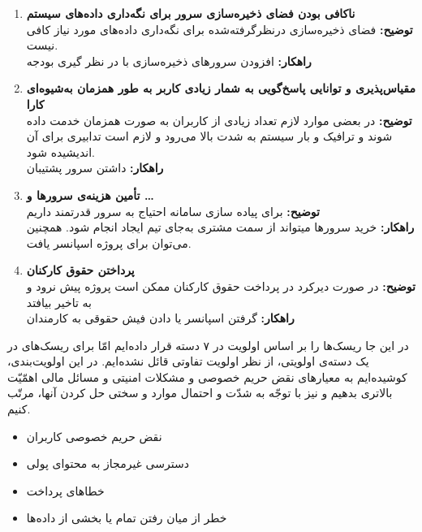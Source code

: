 \begin{enumerate}[start = 19]
    \item \textbf{ناکافی بودن فضای ذخیره‌سازی سرور برای نگه‌داری داده‌های سیستم}
       \\\textbf{توضیح: }
        فضای ذخیره‌سازی درنظرگرفته‌شده برای نگه‌داری داده‌های مورد نیاز کافی نیست.
       \\\textbf{راهکار: }
        افزودن  سرورهای ذخیره‌سازی با در نظر گیری بودجه
    \item \textbf{مقیاس‌پذیری و توانایی پاسخ‌گویی به شمار زیادی کاربر به طور همزمان به‌شیوه‌ای کارا        }
       \\\textbf{توضیح: }
        در بعضی موارد لازم  تعداد زیادی از کاربران به صورت همزمان خدمت داده شوند و ترافیک و بار سیستم به شدت بالا می‌رود و لازم است تدابیری برای آن اندیشیده شود.
       \\\textbf{راهکار: }
        داشتن سرور پشتیبان
    \item \textbf{تأمین‌ هزینه‌ی سرورها و \dots}
       \\\textbf{توضیح: }
        برای پیاده سازی سامانه احتیاج به سرور قدرتمند داریم
       \\\textbf{راهکار: }
        خرید سرورها میتواند از سمت مشتری به‌جای تیم ایجاد انجام شود. همچنین می‌توان برای پروژه اسپانسر یافت.
    \item \textbf{پرداختن حقوق کارکنان}
       \\\textbf{توضیح: }
        در صورت دیرکرد در پرداخت حقوق کارکنان ممکن است پروژه پیش نرود و به تاخیر بیافتد 
       \\\textbf{راهکار: }
        گرفتن اسپانسر یا دادن فیش حقوقی به کارمندان
\end{enumerate}

        در این جا ریسک‌ها را بر اساس اولویت در ۷ دسته قرار داده‌ایم
        امّا برای ریسک‌های در یک دسته‌ی اولویتی، از نظر اولویت
        تفاوتی قائل نشده‌ایم. در این اولویت‌بندی، کوشیده‌ایم
        به معیارهای نقض حریم خصوصی و مشکلات امنیتی و مسائل مالی
        اهمّیّت بالاتری بدهیم و نیز با توجّه به شدّت و احتمال موارد
        و سختی حل کردن آنها، مرتّب کنیم.

        \begin{itemize}
            \item نقض حریم خصوصی کاربران
            \item دسترسی غیرمجاز به محتوای پولی
            \item خطاهای پرداخت
            \item خطر از میان رفتن تمام یا بخشی از داده‌ها
        \end{itemize}

